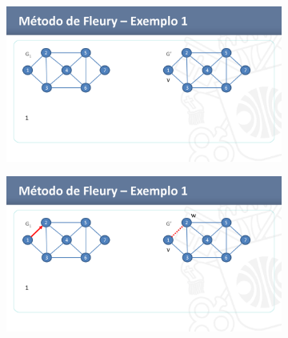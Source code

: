 \begin{figure}[H]
	\begin{subfigure}{.6\textwidth}
		\centering
		\includegraphics[width=\textwidth]{imagem/graficos/1a1455b7b9174768d1c6a0d41673e79dHTztESkzBtQzsXWu-25.png}
	\end{subfigure}
	\begin{subfigure}{.6\textwidth}
		\centering
		\includegraphics[width=\textwidth]{imagem/graficos/1a1455b7b9174768d1c6a0d41673e79dHTztESkzBtQzsXWu-26.png}
	\end{subfigure}
\end{figure}
